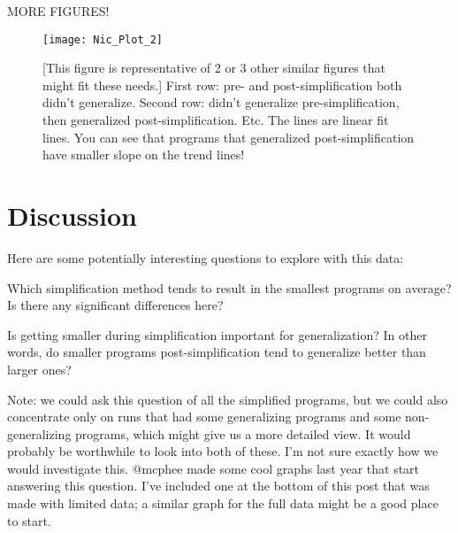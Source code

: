 %
%

MORE FIGURES!

\begin{figure*}[t] %
\centering
\texttt{[image: Nic\_Plot\_2]} %
\caption{[This figure is representative of 2 or 3 other similar figures that might fit these needs.] First row: pre- and post-simplification both didn't generalize. Second row: didn't generalize pre-simplification, then generalized post-simplification. Etc. The lines are linear fit lines. You can see that programs that generalized post-simplification have smaller slope on the trend lines!}
\label{fig:nic-plot}
\end{figure*}



\section{Discussion}
\label{sec:discussion}


Here are some potentially interesting questions to explore with this data:

    Which simplification method tends to result in the smallest programs on average? Is there any significant differences here?

    Is getting smaller during simplification important for generalization? In other words, do smaller programs post-simplification tend to generalize better than larger ones?

        Note: we could ask this question of all the simplified programs, but we could also concentrate only on runs that had some generalizing programs and some non-generalizing programs, which might give us a more detailed view. It would probably be worthwhile to look into both of these. I'm not sure exactly how we would investigate this. @mcphee made some cool graphs last year that start answering this question. I've included one at the bottom of this post that was made with limited data; a similar graph for the full data might be a good place to start.

